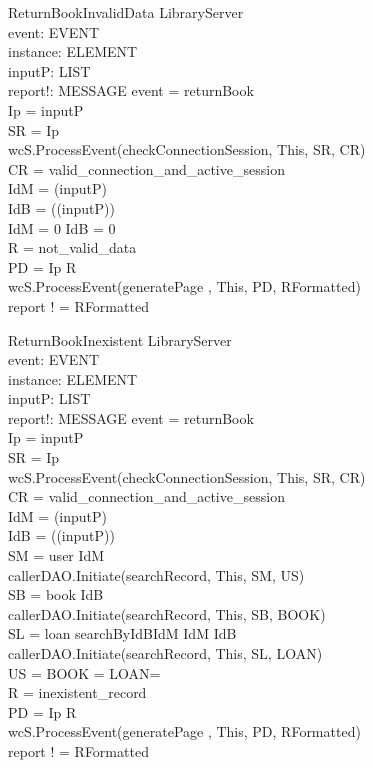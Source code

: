 \begin{schema}{ReturnBookInvalidData}
\Delta LibraryServer \\
event: EVENT \\
instance: ELEMENT \\
inputP: LIST \\
report!: MESSAGE
\where event = returnBook \\
Ip = \head inputP \\
SR = \lseq Ip \rseq \\ 
wcS.ProcessEvent(checkConnectionSession, This, SR, CR) \\
CR = valid\_connection\_and\_active\_session \\
IdM = \head (\tail inputP) \\
IdB = \head (\tail (\tail inputP)) \\
IdM = 0 \lor IdB = 0 \\ 
R = not\_valid\_data \\
PD = \lseq Ip R \rseq \\
wcS.ProcessEvent(generatePage , This, PD, RFormatted) \\
report ! = RFormatted
\end{schema}

\begin{schema}{ReturnBookInexistent}
\Delta LibraryServer \\
event: EVENT \\
instance: ELEMENT \\
inputP: LIST \\
report!: MESSAGE
\where event = returnBook \\
Ip = \head inputP \\
SR = \lseq Ip \rseq \\ 
wcS.ProcessEvent(checkConnectionSession, This, SR, CR) \\
CR = valid\_connection\_and\_active\_session \\
IdM = \head (\tail inputP) \\
IdB = \head (\tail (\tail inputP)) \\
SM = \lseq user IdM \rseq \\
callerDAO.Initiate(searchRecord, This, SM, US) \\
SB = \lseq book IdB \rseq \\
callerDAO.Initiate(searchRecord, This, SB, BOOK) \\
SL = \lseq loan searchByIdBIdM IdM IdB \rseq \\
callerDAO.Initiate(searchRecord, This, SL, LOAN) \\
US = \emptyset \lor BOOK = \emptyset \lor LOAN=\emptyset \\ 
R = inexistent\_record \\
PD = \lseq Ip R \rseq \\
wcS.ProcessEvent(generatePage , This, PD, RFormatted) \\
report ! = RFormatted
\end{schema}

